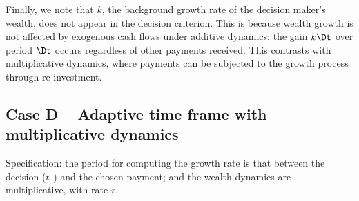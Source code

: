 %
%
%
%

Finally, we note that $k$, the background growth rate of the decision maker's wealth, does not appear in the decision criterion. This is because wealth growth is not affected by exogenous cash flows under additive dynamics: the gain $k\Dt$ over period $\Dt$ occurs regardless of other payments received. This contrasts with multiplicative dynamics, where payments can be subjected to the growth process through re-investment.

\subsection{Case D -- Adaptive time frame with multiplicative dynamics}\label{sec:case_B}

Specification: the period for computing the growth rate is that between the decision ($t_0$) and the chosen payment; and the wealth dynamics are multiplicative, with rate $r$.

